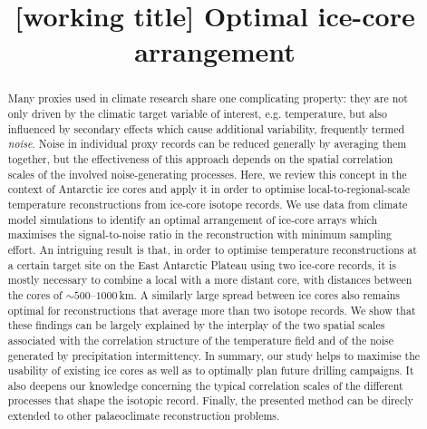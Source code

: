 \documentclass[cp, manuscript, draft]{copernicus}
\begin{document}
\title{[working title] Optimal ice-core arrangement}




\received{}
\pubdiscuss{}
\revised{}
\accepted{}
\published{}


\maketitle

\begin{abstract} Many proxies used in climate research share one complicating
property: they are not only driven by the climatic target variable of interest,
e.g. temperature, but also influenced by secondary effects which cause
additional variability, frequently termed \emph{noise}. Noise in individual
proxy records can be reduced generally by averaging them together, but the
effectiveness of this approach depends on the spatial correlation scales of the
involved noise-generating processes. Here, we review this concept in the context
of Antarctic ice cores and apply it in order to optimise local-to-regional-scale
temperature reconstructions from ice-core isotope records. We use data from
climate model simulations to identify an optimal arrangement of ice-core arrays
which maximises the signal-to-noise ratio in the reconstruction with minimum
sampling effort. An intriguing result is that, in order to optimise
temperature reconstructions at a certain target site on the East Antarctic
Plateau using two ice-core records, it is mostly necessary to combine a local
with a more distant core, with distances between the cores of
$\sim500$--$1000$\,km. A similarly large spread between ice cores also remains
optimal for reconstructions that average more than two isotope records. We show
that these findings can be largely explained by the interplay of the two spatial
scales associated with the correlation structure of the temperature field and of
the noise generated by precipitation intermittency. In summary, our study helps
to maximise the usability of existing ice cores as well as to optimally plan
future drilling campaigns. It also deepens our knowledge concerning the typical
correlation scales of the different processes that shape the isotopic
record. Finally, the presented method can be direcly extended to other
palaeoclimate reconstruction problems.
\end{abstract}
\end{document}

